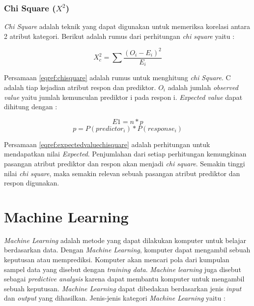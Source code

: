 \subsubsection{Chi Square ($X^2 $)}
\textit{Chi Square} adalah teknik yang dapat digunakan untuk memeriksa korelasi antara 2 atribut kategori. Berikut adalah rumus dari perhitungan \textit{chi square} yaitu : 

\begin{equation}
X_{c}^{2} = \sum \frac{(O_i - E_i)^2}{E_i}
\label{eqref:chisquare}
\end{equation}

Persamaan \ref{eqref:chisquare} adalah rumus untuk menghitung \textit{chi Square}. C adalah tiap kejadian atribut respon dan prediktor. $O_i$ adalah jumlah \textit{observed value} yaitu jumlah kemunculan prediktor i pada respon i. \textit{Expected value} dapat dihitung dengan :

\begin{equation}
E1 = n * p 
\end{equation}
\begin{equation}
p = P(predictor_i) * P(response_i) 
\label{eqref:expectedvaluechisquare}
\end{equation}

Persamaan \ref{eqref:expectedvaluechisquare} adalah perhitungan untuk mendapatkan nilai \textit{Expected}. Penjumlahan dari setiap perhitungan kemungkinan pasangan atribut prediktor dan respon akan menjadi \textit{chi square}. Semakin tinggi nilai \textit{chi square}, maka semakin relevan sebuah pasangan atribut prediktor dan respon digunakan.


\section{Machine Learning  \cite{tan_steinbach_karpatne_kumar_2020}} 
\textit{Machine Learning} adalah metode yang dapat dilakukan komputer untuk belajar berdasarkan data. Dengan \textit{Machine Learning}, komputer dapat mengambil sebuah keputusan atau memprediksi. Komputer akan mencari pola dari kumpulan sampel data yang disebut dengan \textit{training data}. \textit{Machine learning} juga disebut sebagai \textit{predictive analysis} karena dapat membantu komputer untuk mengambil sebuah keputusan. \textit{Machine Learning} dapat dibedakan berdasarkan jenis \textit{input} dan \textit{output} yang dihasilkan. Jenis-jenis kategori \textit{Machine Learning} yaitu :  
		
